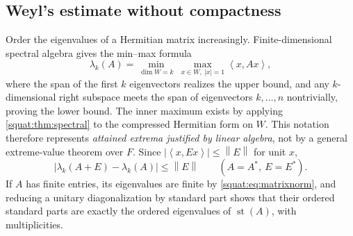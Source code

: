 \documentclass[11pt,letterpaper]{article}
\numberwithin{equation}{section}
\theoremstyle{definition}
\theoremstyle{remark}
\newcommand{\st}{\operatorname{st}}
\newcommand{\abs}[1]{\left|#1\right|}
\newcommand{\norm}[1]{\left\|#1\right\|}
\newcommand{\angles}[1]{\left\langle#1\right\rangle}
\begin{document}
\subsection{Weyl's estimate without compactness}\label{squat:sub:weyl}
Order the eigenvalues of a Hermitian matrix increasingly. Finite-dimensional spectral
algebra gives the min--max formula
\[
 \lambda_k(A)=\min_{\dim W=k}\ \max_{x\in W,\ \abs x=1}\angles{x,Ax},
\]
where the span of the first $k$ eigenvectors realizes the upper bound, and any
$k$-dimensional right subspace meets the span of eigenvectors $k,\ldots,n$ nontrivially,
proving the lower bound. The inner maximum exists by applying \cref{squat:thm:spectral} to
the compressed Hermitian form on $W$. This notation therefore represents \emph{attained
extrema justified by linear algebra}, not by a general extreme-value theorem over $F$.
Since $\abs{\angles{x,Ex}}\le\norm E$ for unit $x$,
\begin{equation}\label{squat:eq:weyl}
 \abs{\lambda_k(A+E)-\lambda_k(A)}\le\norm E\qquad(A=A^*,\ E=E^*).
\end{equation}
If $A$ has finite entries, its eigenvalues are finite by \cref{squat:eq:matrixnorm}, and
reducing a unitary diagonalization by standard part shows that their ordered standard parts
are exactly the ordered eigenvalues of $\st(A)$, with multiplicities.
\end{document}
